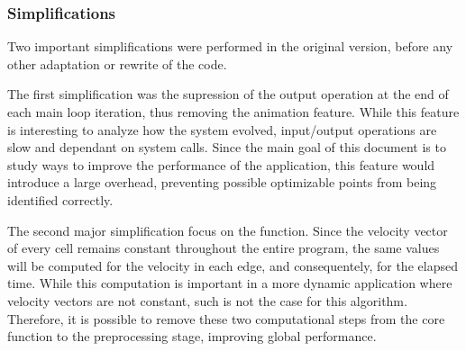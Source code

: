 \subsubsection{Simplifications}
\label{sec:311}

Two important simplifications were performed in the original version, before any other adaptation or rewrite of the code.

The first simplification was the supression of the output operation at the end of each main loop iteration, thus removing the animation feature. While this feature is interesting to analyze how the system evolved, input/output operations are slow and dependant on system calls. Since the main goal of this document is to study ways to improve the performance of the \polu application, this feature would introduce a large overhead, preventing possible optimizable points from being identified correctly.

The second major simplification focus on the \computeflux function. Since the velocity vector of every cell remains constant throughout the entire program, the same values will be computed for the velocity in each edge, and consequentely, for the elapsed time. While this computation is important in a more dynamic application where velocity vectors are not constant, such is not the case for this algorithm. Therefore, it is possible to remove these two computational steps from the core function to the preprocessing stage, improving global performance.
